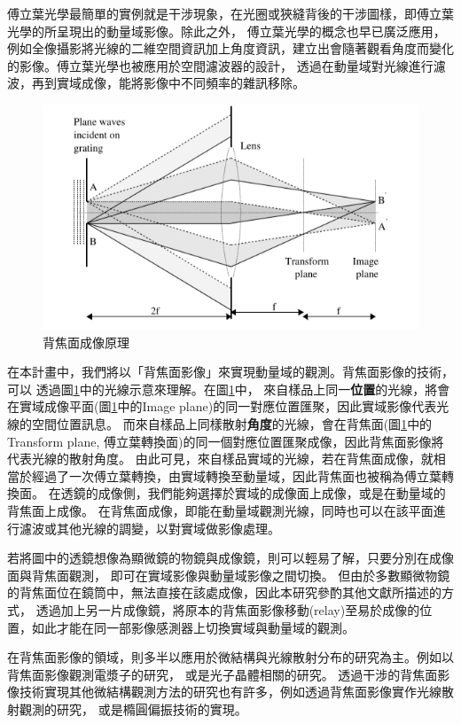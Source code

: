 \documentclass[12pt]{article}
\begin{document}
傅立葉光學最簡單的實例就是干涉現象，在光圈或狹縫背後的干涉圖樣，即傅立葉光學的所呈現出的動量域影像。除此之外，
傅立葉光學的概念也早已廣泛應用，例如全像攝影將光線的二維空間資訊加上角度資訊，建立出會隨著觀看角度而變化的影像。傅立葉光學也被應用於空間濾波器的設計，
透過在動量域對光線進行濾波，再到實域成像，能將影像中不同頻率的雜訊移除。
\begin{figure}[h]
    \centering
    \includegraphics[width=\linewidth]{bfp.png}
    \caption{背焦面成像原理\cite{lightfantastic}}
    \label{bfpimage}
\end{figure}

在本計畫中，我們將以「背焦面影像」來實現動量域的觀測。背焦面影像的技術，可以
透過圖\ref{bfpimage}中的光線示意來理解。在圖\ref{bfpimage}中，
來自樣品上同一\textbf{位置}的光線，將會在實域成像平面(圖\ref{bfpimage}中的Image plane)的同一對應位置匯聚，因此實域影像代表光線的空間位置訊息。
而來自樣品上同樣散射\textbf{角度}的光線，會在背焦面(圖\ref{bfpimage}中的Transform plane, 傅立葉轉換面)的同一個對應位置匯聚成像，因此背焦面影像將代表光線的散射角度。
由此可見，來自樣品實域的光線，若在背焦面成像，就相當於經過了一次傅立葉轉換，由實域轉換至動量域，因此背焦面也被稱為傅立葉轉換面。
在透鏡的成像側，我們能夠選擇於實域的成像面上成像，或是在動量域的背焦面上成像。
在背焦面成像，即能在動量域觀測光線，同時也可以在該平面進行濾波或其他光線的調變，以對實域做影像處理。

若將圖中的透鏡想像為顯微鏡的物鏡與成像鏡，則可以輕易了解，只要分別在成像面與背焦面觀測，
即可在實域影像與動量域影像之間切換。
但由於多數顯微物鏡的背焦面位在鏡筒中，無法直接在該處成像，因此本研究參酌其他文獻\cite{bfpimage}所描述的方式，
透過加上另一片成像鏡，將原本的背焦面影像移動(relay)至易於成像的位置，如此才能在同一部影像感測器上切換實域與動量域的觀測。

在背焦面影像的領域，則多半以應用於微結構與光線散射分布的研究為主。例如以背焦面影像觀測電漿子的研究，
或是光子晶體相關的研究\cite{hartmann2013radiation,zhang2014back,wagner2012back}。
透過干涉的背焦面影像技術實現其他微結構觀測方法的研究也有許多，例如透過背焦面影像實作光線散射觀測的研究\cite{davidson2006interferometric}，
或是橢圓偏振技術的實現\cite{feke1998interferometric}。
\end{document}
